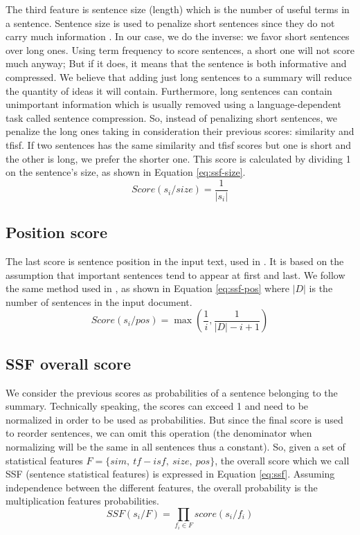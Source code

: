 The third feature is sentence size (length) which is the number of useful terms in a sentence. 
Sentence size is used to penalize short sentences since they do not carry much information \citep{95-kupiec-al}.
In our case, we do the inverse: we favor short sentences over long ones. 
Using term frequency to score sentences, a short one will not score much anyway; 
But if it does, it means that the sentence is both informative and compressed.
We believe that adding just long sentences to a summary will reduce the quantity of ideas it will contain.
Furthermore, long sentences can contain unimportant information which is usually removed using a language-dependent task called sentence compression. 
So, instead of penalizing short sentences, we penalize the long ones taking in consideration their previous scores: similarity and \ac{tfisf}. 
If two sentences has the same similarity and \ac{tfisf} scores but one is short and the other is long, we prefer the shorter one.
This score is calculated by dividing 1 on the sentence's size, as shown in Equation \ref{eq:ssf-size}.
\begin{equation}
	Score(s_i/ size) = \frac{1}{|s_i|}
	\label{eq:ssf-size}
\end{equation}

\subsection{Position score}

The last score is sentence position in the input text, used in \citep{58-baxendale,69-edmundson}.
It is based on the assumption that important sentences tend to appear at first and last. 
We follow the same method used in \citep{04-nobata-sekine}, as shown in Equation \ref{eq:ssf-pos} where $ |D| $ is the number of sentences in the input document.
\begin{equation}
	Score(s_i/ pos) = \max (\frac{1}{i}, \frac{1}{|D| - i + 1})
	\label{eq:ssf-pos}
\end{equation}

\subsection{SSF overall score}

We consider the previous scores as probabilities of a sentence belonging to the summary. 
Technically speaking, the scores can exceed 1 and need to be normalized in order to be used as probabilities. 
But since the final score is used to reorder sentences, we can omit this operation (the denominator when normalizing will be the same in all sentences thus a constant). 
So, given a set of statistical features $ F = \{ sim,\ tf-isf,\ size,\ pos \} $, the overall score which we call SSF (sentence statistical features) is expressed in Equation \ref{eq:ssf}.
Assuming independence between the different features, the overall probability is the multiplication features probabilities.
% 
\begin{equation}
SSF(s_i/ F) = \prod_{f_i \in F} score(s_i/f_i)
\label{eq:ssf}
\end{equation}

